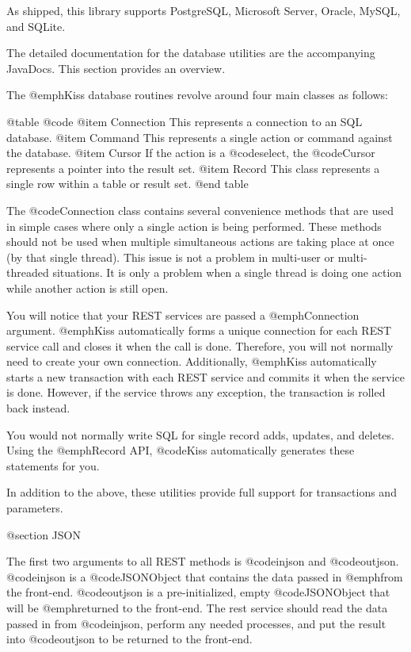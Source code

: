 As shipped, this library supports PostgreSQL, Microsoft Server, Oracle, MySQL, and SQLite.

The detailed documentation for the database utilities are the
accompanying JavaDocs.  This section provides an overview.

The @emph{Kiss} database routines revolve around four main classes as follows:

@table @code
@item Connection
This represents a connection to an SQL database.
@item Command
This represents a single action or command against the database.
@item Cursor
If the action is a @code{select}, the @code{Cursor} represents a pointer into the result set.
@item Record
This class represents a single row within a table or result set.
@end table

The @code{Connection} class contains several convenience methods that
are used in simple cases where only a single action is being
performed.  These methods should not be used when multiple
simultaneous actions are taking place at once (by that single thread).
This issue is not a problem in multi-user or multi-threaded
situations.  It is only a problem when a single thread is doing one
action while another action is still open.

You will notice that your REST services are passed a @emph{Connection}
argument.  @emph{Kiss} automatically forms a unique connection for
each REST service call and closes it when the call is done.
Therefore, you will not normally need to create your own connection.
Additionally, @emph{Kiss} automatically starts a new transaction with
each REST service and commits it when the service is done.  However,
if the service throws any exception, the transaction is rolled back
instead.

You would not normally write SQL for single record adds, updates, and
deletes.  Using the @emph{Record} API, @code{Kiss} automatically
generates these statements for you.

In addition to the above, these utilities provide full support for transactions and parameters.

@section JSON

The first two arguments to all REST methods is @code{injson} and
@code{outjson}.  @code{injson} is a @code{JSONObject} that contains
the data passed in @emph{from} the front-end.  @code{outjson} is a
pre-initialized, empty @code{JSONObject} that will be @emph{returned
to} the front-end.  The rest service should read the data passed in
from @code{injson}, perform any needed processes, and put the result
into @code{outjson} to be returned to the front-end.


